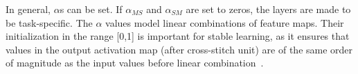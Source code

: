 In general, $\alpha$s can be set. If $\alpha_{MS}$ and $\alpha_{SM}$
are set to zeros, the layers are made to be task-specific.  The
$\alpha$ values model linear combinations of feature maps. Their
initialization in the range [0,1] is important for stable learning, as
it ensures that values in the output activation map (after
cross-stitch unit) are of the same order of magnitude as the input
values before linear combination~\cite{misra2016cross}.














